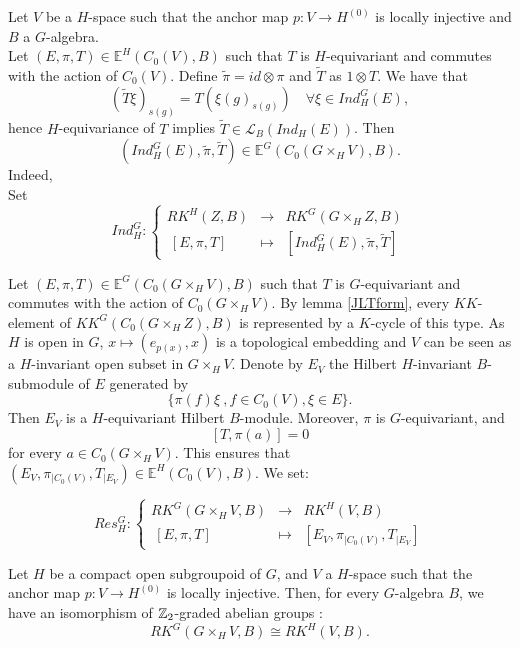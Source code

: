 
Let $V$ be a $H$-space such that the anchor map $p : V\rightarrow H^{(0)}$ is locally injective and $B$ a $G$-algebra. \\

Let $(E,\pi,T)\in \mathbb E^H(C_0(V),B)$ such that $T$ is $H$-equivariant and commutes with the action of $C_0(V)$. Define $\tilde\pi = id\otimes \pi$ and $\tilde T$ as $1\otimes T$. We have that 
\[(\tilde T\xi)_{s(g)} = T(\xi(g)_{s(g)})\quad \forall \xi \in Ind_H^G(E),  \]
hence $H$-equivariance of $T$ implies $\tilde T\in\mathcal L_B(Ind_H (E))$. Then 
\[(Ind_H^G (E), \tilde \pi, \tilde T)\in \mathbb E^G(C_0(G\times_H V),B).\] Indeed, \\ %

Set
\[Ind_H^G :
\left\{\begin{array}{rcl} 
RK^H(Z,B) & \rightarrow & RK^G(G\times_H Z,B) \\
\ [E,\pi,T ] & \mapsto & [ Ind_H^G (E), \tilde \pi, \tilde T ] \end{array} \right.\]

Let $(E,\pi,T)\in \mathbb E^G(C_0(G\times_H V),B)$ such that $T$ is $G$-equivariant and commutes with the action of $C_0(G\times_H V)$. By lemma \ref{JLTform}, every $KK$-element of $KK^G(C_0(G\times_H Z),B)$ is represented by a $K$-cycle of this type.  As $H$ is open in $G$, $x\mapsto (e_{p(x)},x)$ is a topological embedding and $V$ can be seen as a $H$-invariant open subset in $G\times_H V$. Denote by $E_V$ the Hilbert $H$-invariant $B$-submodule of $E$ generated by 
\[\{\pi(f)\xi \ ,f\in C_0(V), \xi\in E\}.\]
Then $E_{V}$ is a $H$-equivariant Hilbert $B$-module. Moreover, $\pi$ is $G$-equivariant, and \[[T,\pi(a)]=0\] for every $a\in C_0(G\times_H V)$. This ensures that $(E_V,\pi_{|C_0(V)}, T_{|E_V}) \in \mathbb E^H(C_0(V),B)$. We set:

\[Res_H^G :
\left\{\begin{array}{rcl} 
 RK^G(G\times_H V,B) & \rightarrow & RK^H(V,B) \\
\ [E,\pi,T ] & \mapsto & [ E_V,\pi_{|C_0(V)}, T_{|E_V} ] \end{array} \right.\]

\begin{lem} \label{Restriction} Let $H$ be a compact open subgroupoid of $G$, and $V$ a $H$-space such that the anchor map $p : V\rightarrow H^{(0)}$ is locally injective. Then, for every $G$-algebra $B$, we have an isomorphism of $\mathbb Z_2$-graded abelian groups :
\[RK^G( G\times_H V, B) \cong RK^H(V, B).\]
\end{lem}

